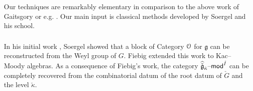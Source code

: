 \documentclass[11pt,reqno]{amsart}
\newcommand{\cgk}{\widehat{\check{\mathfrak{g}}}_{\check{\kappa}}}
\newcommand{\fg}{\mathfrak{g}}
\theoremstyle{remark}
\numberwithin{equation}{section}
\newcommand{\ck}{\check{\kappa}}
\newcommand{\cG}{\check{G}}
\renewcommand{\mod}{\text{\textendash}\mathsf{mod}}
\begin{document}
Our techniques are remarkably elementary in comparison to 
the above work of Gaitsgory or e.g. \cite{ab}.
Our main input is classical methods developed by Soergel and his
school.






\subsubsection{}

In his initial work \cite{soergel}, Soergel showed that a
block of Category $\EuScript{O}$ for $\fg$ can be reconstructed 
from the Weyl group of $G$.
Fiebig \cite{fiebig} extended this work to Kac--Moody algebras.
As a consequence of Fiebig's work,
the category $\cgk\mod^{\check{I}}$ can be completely recovered
from the combinatorial datum of the root datum of $\cG$ and the level $\ck$.
\end{document}
